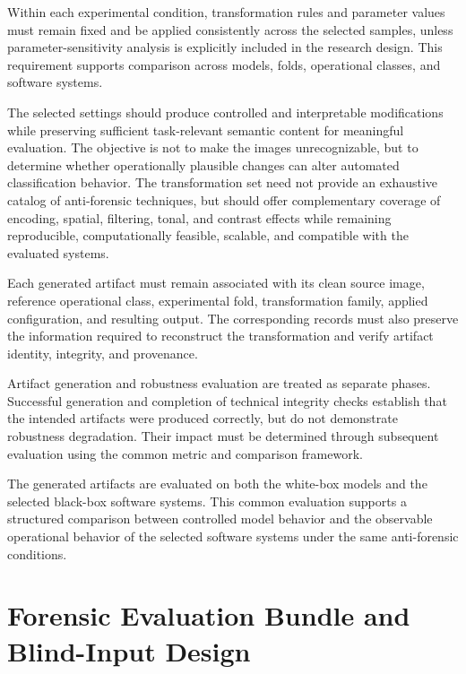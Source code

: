 Within each experimental condition, transformation rules and parameter values
must remain fixed and be applied consistently across the selected samples,
unless parameter-sensitivity analysis is explicitly included in the research
design. This requirement supports comparison across models, folds, operational
classes, and software systems.

The selected settings should produce controlled and interpretable
modifications while preserving sufficient task-relevant semantic content for
meaningful evaluation. The objective is not to make the images
unrecognizable, but to determine whether operationally plausible changes can
alter automated classification behavior. The transformation set need not
provide an exhaustive catalog of anti-forensic techniques, but should offer
complementary coverage of encoding, spatial, filtering, tonal, and contrast
effects while remaining reproducible, computationally feasible, scalable, and
compatible with the evaluated systems.

Each generated artifact must remain associated with its clean source image,
reference operational class, experimental fold, transformation family,
applied configuration, and resulting output. The corresponding records must
also preserve the information required to reconstruct the transformation and
verify artifact identity, integrity, and provenance.

Artifact generation and robustness evaluation are treated as separate phases.
Successful generation and completion of technical integrity checks establish
that the intended artifacts were produced correctly, but do not demonstrate
robustness degradation. Their impact must be determined through subsequent
evaluation using the common metric and comparison framework.

The generated artifacts are evaluated on both the white-box models
and the selected black-box software systems. This common evaluation supports a
structured comparison between controlled model behavior and the observable
operational behavior of the selected software systems under the same
anti-forensic conditions.

\section{Forensic Evaluation Bundle and Blind-Input Design}
\label{sec:methodology-forensic-evaluation-bundle}

